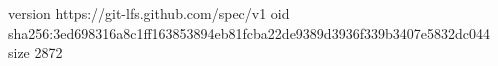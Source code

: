 version https://git-lfs.github.com/spec/v1
oid sha256:3ed698316a8c1ff163853894eb81fcba22de9389d3936f339b3407e5832dc044
size 2872
